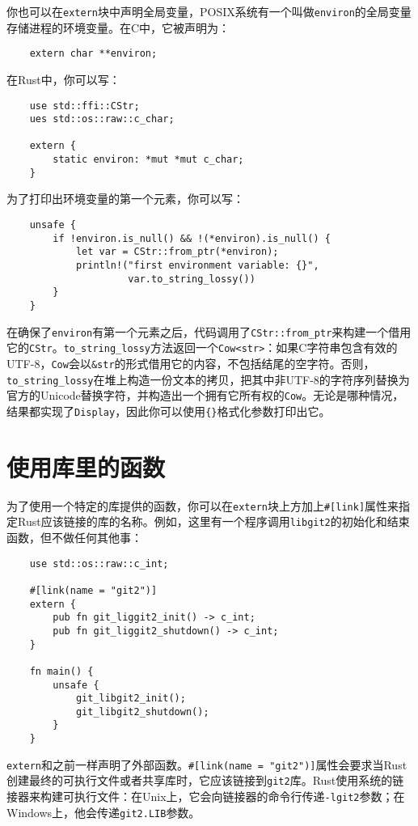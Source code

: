 你也可以在\texttt{extern}块中声明全局变量，POSIX系统有一个叫做\texttt{environ}的全局变量存储进程的环境变量。在C中，它被声明为：
\begin{verbatim}
    extern char **environ;
\end{verbatim}

在Rust中，你可以写：
\begin{verbatim}
    use std::ffi::CStr;
    ues std::os::raw::c_char;

    extern {
        static environ: *mut *mut c_char;
    }
\end{verbatim}

为了打印出环境变量的第一个元素，你可以写：
\begin{verbatim}
    unsafe {
        if !environ.is_null() && !(*environ).is_null() {
            let var = CStr::from_ptr(*environ);
            println!("first environment variable: {}",
                     var.to_string_lossy())
        }
    }
\end{verbatim}

在确保了\texttt{environ}有第一个元素之后，代码调用了\texttt{CStr::from\_ptr}来构建一个借用它的\texttt{CStr}。\texttt{to\_string\_lossy}方法返回一个\texttt{Cow<str>}：如果C字符串包含有效的UTF-8，\texttt{Cow}会以\texttt{\&str}的形式借用它的内容，不包括结尾的空字符。否则，\texttt{to\_string\_lossy}在堆上构造一份文本的拷贝，把其中非UTF-8的字符序列替换为官方的Unicode替换字符，并构造出一个拥有它所有权的\texttt{Cow}。无论是哪种情况，结果都实现了\texttt{Display}，因此你可以使用\texttt{\{\}}格式化参数打印出它。

\section{使用库里的函数}
为了使用一个特定的库提供的函数，你可以在\texttt{extern}块上方加上\texttt{\#[link]}属性来指定Rust应该链接的库的名称。例如，这里有一个程序调用\texttt{libgit2}的初始化和结束函数，但不做任何其他事：
\begin{verbatim}
    use std::os::raw::c_int;

    #[link(name = "git2")]
    extern {
        pub fn git_liggit2_init() -> c_int;
        pub fn git_liggit2_shutdown() -> c_int;
    }

    fn main() {
        unsafe {
            git_libgit2_init();
            git_libgit2_shutdown();
        }
    }
\end{verbatim}

\texttt{extern}和之前一样声明了外部函数。\texttt{\#[link(name = "git2")]}属性会要求当Rust创建最终的可执行文件或者共享库时，它应该链接到\texttt{git2}库。Rust使用系统的链接器来构建可执行文件：在Unix上，它会向链接器的命令行传递\texttt{-lgit2}参数；在Windows上，他会传递\texttt{git2.LIB}参数。

